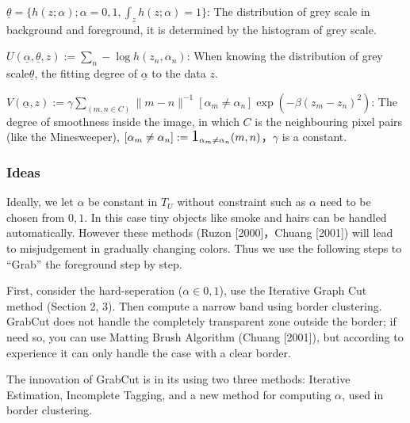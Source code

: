 \documentclass[a4paper, 11pt, nofonts, nocap, fancyhdr, hyperref, UTF8]{ctexart}
\begin{document}
$\underline{\theta} = \{h(z; \alpha); \alpha = 0,1, \int_z h(z; \alpha) = 1\}$: The distribution of grey scale in background and foreground, it is determined by the histogram of grey scale.

$U(\underline{\alpha},\underline{\theta},z) := \sum_n -\log h(z_n, \alpha_n)$: When knowing the distribution of grey scale$\underline{\theta}$, the fitting degree of $\underline{\alpha}$ to the data $z$.

$V(\underline{\alpha},z) := \gamma \sum_{(m,n \in C)} \|m-n\|^{-1}[\alpha_m \neq \alpha_n]  \exp (-\beta(z_m - z_n)^2)$: The degree of smoothness inside the image, in which $C$ is the neighbouring pixel pairs (like the Minesweeper), $[\alpha_m \neq \alpha_n] := \text{\Large 1}_{\alpha_m \neq \alpha_n}(m,n)$，$\gamma$ is a constant.

\subsubsection{Ideas}
Ideally, we let $\alpha$ be constant in $T_U$ without constraint such as $\alpha$ need to be chosen from ${0, 1}$. In this case tiny objects like smoke and hairs can be handled automatically. However these methods (Ruzon [2000]，Chuang [2001]) will lead to misjudgement in gradually changing colors. Thus we use the following steps to ``Grab'' the foreground step by step.

First, consider the hard-seperation ($\alpha \in {0,1}$), use the Iterative Graph Cut method (Section 2, 3). Then compute a narrow band using border clustering. GrabCut does not handle the completely transparent zone outside the border; if need so, you can use Matting Brush Algorithm (Chuang [2001]), but according to experience it can only handle the case with a clear border.

The innovation of GrabCut is in its using two three methods: Iterative Estimation, Incomplete Tagging, and a new method for computing $\alpha$, used in border clustering.
\end{document}
